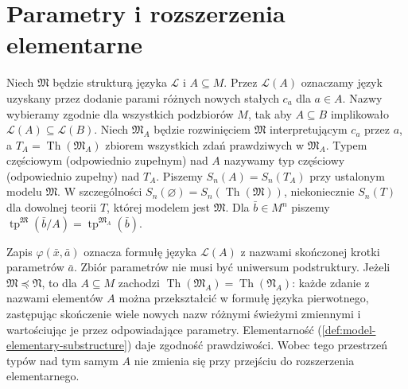 \section{Parametry i rozszerzenia elementarne}
\begin{definicja}
\label{def:mod-type-over-parameters}
Niech $\mathfrak M$ będzie strukturą języka $\mathcal L$
i $A\subseteq M$. Przez $\mathcal L(A)$ oznaczamy język
uzyskany przez dodanie parami różnych nowych stałych $c_a$
dla $a\in A$. Nazwy wybieramy zgodnie dla wszystkich
podzbiorów $M$, tak aby $A\subseteq B$ implikowało
$\mathcal L(A)\subseteq\mathcal L(B)$.
Niech $\mathfrak M_A$ będzie rozwinięciem $\mathfrak M$
interpretującym $c_a$ przez $a$, a
$T_A=\operatorname{Th}(\mathfrak M_A)$ zbiorem wszystkich
zdań prawdziwych w $\mathfrak M_A$.
Typem częściowym (odpowiednio zupełnym) nad $A$ nazywamy
typ częściowy (odpowiednio zupełny) nad $T_A$.
Piszemy $S_n(A)=S_n(T_A)$ przy ustalonym modelu $\mathfrak M$.
W szczególności $S_n(\varnothing)=S_n(\operatorname{Th}(\mathfrak M))$,
niekoniecznie $S_n(T)$ dla dowolnej teorii $T$, której modelem
jest $\mathfrak M$.
Dla $\bar b\in M^n$ piszemy
$\operatorname{tp}^{\mathfrak M}(\bar b/A)
=\operatorname{tp}^{\mathfrak M_A}(\bar b)$.
\end{definicja}

Zapis $\varphi(\bar x,\bar a)$ oznacza formułę języka $\mathcal L(A)$
z nazwami skończonej krotki parametrów $\bar a$.
Zbiór parametrów nie musi być uniwersum podstruktury.
Jeżeli $\mathfrak M\preccurlyeq\mathfrak N$, to dla
$A\subseteq M$ zachodzi
$\operatorname{Th}(\mathfrak M_A)=\operatorname{Th}(\mathfrak N_A)$:
każde zdanie z nazwami elementów $A$ można przekształcić
w formułę języka pierwotnego, zastępując skończenie wiele
nowych nazw różnymi świeżymi zmiennymi i wartościując je
przez odpowiadające parametry. Elementarność
(\ref{def:model-elementary-substructure}) daje zgodność
prawdziwości. Wobec tego przestrzeń typów nad tym samym $A$
nie zmienia się przy przejściu do rozszerzenia elementarnego.

